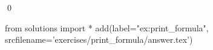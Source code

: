 
\begin{ex} 
  \label{ex:print_formula}
  
  \qed
\end{ex} 
\begin{python0}
from solutions import *
add(label="ex:print_formula",
    srcfilename='exercises/print_formula/answer.tex') 
\end{python0}
